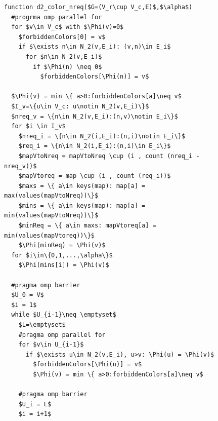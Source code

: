 \documentclass[12pt, twoside,a4paper,toc=bibliography]{scrbook}
\begin{document}
\begin{figure}
\begin{lstlisting}[caption=New coloring heuristic in the bipartite graph model
parallelized by OpenMP,label=code.new.bip.omp,mathescape]
function d2_color_nreq($G=(V_r\cup V_c,E)$,$\alpha$)
  #progrma omp parallel for
  for $v\in V_c$ with $\Phi(v)=0$
    $forbiddenColors[0] = v$
    if $\exists n\in N_2(v,E_i): (v,n)\in E_i$
      for $n\in N_2(v,E_i)$
        if $\Phi(n) \neq 0$
          $forbiddenColors[\Phi(n)] = v$

  $\Phi(v) = min \{ a>0:forbiddenColors[a]\neq v$
  $I_v=\{u\in V_c: u\notin N_2(v,E_i)\}$
  $nreq_v = \{n\in N_2(v,E_i):(n,v)\notin E_i\}$
  for $i \in I_v$
    $nreq_i = \{n\in N_2(i,E_i):(n,i)\notin E_i\}$
    $req_i = \{n\in N_2(i,E_i):(n,i)\in E_i\}$
    $mapVtoNreq = mapVtoNreq \cup (i , count (nreq_i - nreq_v))$
    $mapVtoreq = map \cup (i , count (req_i))$
    $maxs = \{ a\in keys(map): map[a] = max(values(mapVtoNreq))\}$
    $mins = \{ a\in keys(map): map[a] = min(values(mapVtoNreq))\}$
    $minReq = \{ a\in maxs: mapVtoreq[a] = min(values(mapVtoreq))\}$
    $\Phi(minReq) = \Phi(v)$
  for $i\in\{0,1,...,\alpha\}$
    $\Phi(mins[i]) = \Phi(v)$

  #pragma omp barrier
  $U_0 = V$
  $i = 1$
  while $U_{i-1}\neq \emptyset$
    $L=\emptyset$
    #pragma omp parallel for
    for $v\in U_{i-1}$
      if $\exists u\in N_2(v,E_i), u>v: \Phi(u) = \Phi(v)$
        $forbiddenColors[\Phi(n)] = v$
        $\Phi(v) = min \{ a>0:forbiddenColors[a]\neq v$

    #pragma omp barrier
    $U_i = L$
    $i = i+1$
\end{lstlisting}
\end{figure}
\end{document}
